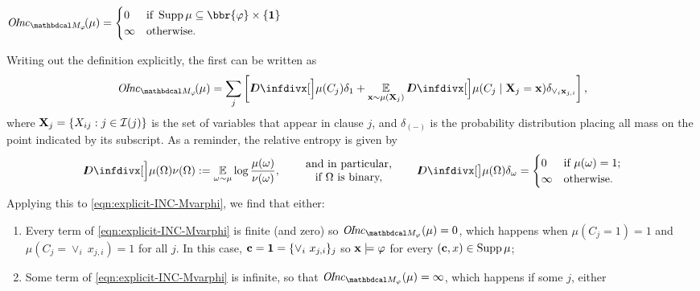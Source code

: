 \begin{lproof}
	\begin{iclaim} \label{claim:separate-inc-varphi}
		$\OInc_{\dg M_\varphi}\!(\mu) =
		\begin{cases}
			0 & \text{if}~  \Supp \mu \subseteq \bbr{\varphi} \times \{ \mat 1\} \\
			\infty & \text{otherwise.}
		\end{cases}$
	\end{iclaim}
	\vspace{-1em}
	\begin{lproof}
		Writing out the definition explicitly, the first can be written as
		\begin{equation}
			\OInc_{\dg M_\varphi}\!(\mu) = \sum_{j} \left[ \kldiv[\Big]{\mu(C_j)}{\delta_1} +
				\Ex_{\mat x \sim \mu(\mat X_j)} \kldiv[\Big]{\mu(C_j \mid \mat X_j = \mat x)}{\delta_{\lor_i \mat x_{j,i}}} \right], \label{eqn:explicit-INC-Mvarphi}
		\end{equation}
		where $\mathbf X_j = \{X_{ij} : j \in \mathcal I(j)\}$ is the set of variables that
		appear in clause $j$, and $\delta_{(-)}$ is the probability distribution placing all mass on the point indicated by its subscript.
		As a reminder, the relative entropy is given by
		\[ \kldiv[\Big]{\mu(\Omega)}{\nu(\Omega)} := \Ex_{\omega \sim \mu} \log \frac{\mu(\omega)}{\nu(\omega)},
		\quad\parbox{1.4in}{\centering and in particular, \\ if $\Omega$ is binary,}\quad
			\kldiv[\big]{\mu(\Omega)}{\delta_\omega} = \begin{cases}
				0 &  \text{if}~\mu(\omega) = 1 ; \\
				\infty & \text{otherwise}.
		\end{cases} \]
		Applying this to \eqref{eqn:explicit-INC-Mvarphi}, we find that either:
		\begin{enumerate}[itemsep=0pt]
			\item Every term of \eqref{eqn:explicit-INC-Mvarphi} is finite (and zero) so $\OInc_{\dg M_\varphi}(\mu) = 0$, which happens when $\mu(C_j = 1) = 1$ and $\mu(C_j = \vee_i~ x_{j,i}) = 1$ for all $j$.  In this case, $\mathbf c = \mathbf 1 = \{ \vee_i~x_{j,i} \}_j$ so $\mathbf x \models \varphi$ for every $(\mathbf c,x) \in \operatorname{\mathrm{Supp}} \mu$;
			\item Some term of \eqref{eqn:explicit-INC-Mvarphi} is infinite, so that $\OInc_{\dg M_\varphi}(\mu) = \infty$, which happens if some $j$, either


\end{enumerate}
\end{lproof}
\end{lproof}
